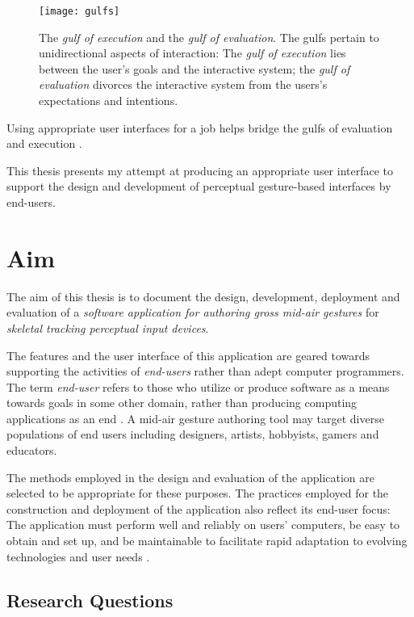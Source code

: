 \begin{SCfigure}[\sidecaptionrelwidth][ht]
\centering
\texttt{[image: gulfs]}
\caption{The \emph{gulf of execution} and the \emph{gulf of evaluation}. The gulfs pertain to unidirectional aspects of interaction: The \emph{gulf of execution} lies between the user's goals and the interactive system; the \emph{gulf of evaluation} divorces the interactive system from the users's expectations and intentions.}
\label{fig:gulfs}
\end{SCfigure}

Using appropriate user interfaces for a job helps bridge the gulfs of evaluation and execution \parencite{Norman:2002}.

This thesis presents my attempt at producing an appropriate user interface to support the design and development of perceptual gesture-based interfaces by end-users.

\section{Aim} %

The aim of this thesis is to document the design, development, deployment and evaluation of a \emph{software application for authoring gross mid-air gestures} for \emph{skeletal tracking perceptual input devices}.

The features and the user interface of this application are geared towards supporting the activities of \emph{end-users} rather than adept computer programmers. The term \emph{end-user} refers to those who utilize or produce software as a means towards goals in some other domain, rather than producing computing applications as an end \parencite{Ko:2011}. A mid-air gesture authoring tool may target diverse populations of end users including designers, artists, hobbyists, gamers and educators.

The methods employed in the design and evaluation of the application are selected to be appropriate for these purposes. The practices employed for the construction and deployment of the application also reflect its end-user focus: The application must perform well and reliably on users' computers, be easy to obtain and set up, and be maintainable to facilitate rapid adaptation to evolving technologies and user needs \parencite{McConnell:2009, Brooks:1995}.

\subsection{Research Questions} %

